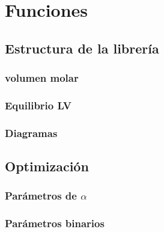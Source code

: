 \chapter{Funciones}
	\section{Estructura de la librería}
		 \subsection{}





		
		
		
		
		
		
		
		
		\subsection{volumen molar}
		\subsection{Equilibrio LV}
		
		
		
		
		
		
		

		
		\subsection{Diagramas}
	\section{Optimización}	
		\subsection{Parámetros de $\alpha$}
		\subsection{Parámetros binarios}
